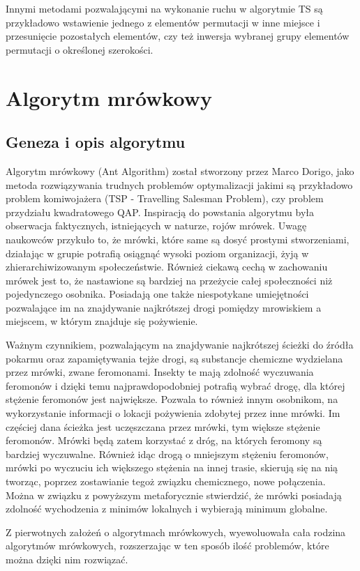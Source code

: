 Innymi metodami pozwalającymi na wykonanie ruchu w algorytmie TS są przykładowo wstawienie jednego z elementów permutacji w inne miejsce i przesunięcie pozostałych elementów, czy też inwersja wybranej grupy elementów permutacji o określonej szerokości.

\section{Algorytm mrówkowy}
\label{sec:mrowka}
\subsection{Geneza i opis algorytmu}
Algorytm mrówkowy (Ant Algorithm) został stworzony przez Marco Dorigo, jako metoda rozwiązywania trudnych problemów optymalizacji jakimi są przykładowo problem komiwojażera (TSP - Travelling Salesman Problem), czy problem przydziału kwadratowego QAP. Inspiracją do powstania algorytmu była obserwacja faktycznych, istniejących w naturze, rojów mrówek. Uwagę naukowców przykuło to, że mrówki, które same są dosyć prostymi stworzeniami, działając w grupie potrafią osiągnąć wysoki poziom organizacji, żyją w zhierarchiwizowanym społeczeństwie. Również ciekawą cechą w zachowaniu mrówek jest to, że nastawione są bardziej na przeżycie całej społeczności niż pojedynczego osobnika. Posiadają one także niespotykane umiejętności pozwalające im na znajdywanie najkrótszej drogi pomiędzy mrowiskiem a miejscem, w którym znajduje się pożywienie.

Ważnym czynnikiem, pozwalającym na znajdywanie najkrótszej ścieżki do źródła pokarmu oraz zapamiętywania tejże drogi, są substancje chemiczne wydzielana przez mrówki, zwane feromonami. Insekty te mają zdolność wyczuwania feromonów i dzięki temu najprawdopodobniej potrafią wybrać drogę, dla której stężenie feromonów jest największe. Pozwala to również innym osobnikom, na wykorzystanie informacji o lokacji pożywienia zdobytej przez inne mrówki. Im częściej dana ścieżka jest uczęszczana przez mrówki, tym większe stężenie feromonów. Mrówki będą zatem korzystać z dróg, na których feromony są bardziej wyczuwalne. Również idąc drogą o mniejszym stężeniu feromonów, mrówki po wyczuciu ich większego stężenia na innej trasie, skierują się na nią tworząc, poprzez zostawianie tegoż związku chemicznego, nowe połączenia. Można w związku z powyższym metaforycznie stwierdzić, że mrówki posiadają zdolność wychodzenia z minimów lokalnych i wybierają minimum globalne.

Z pierwotnych założeń o algorytmach mrówkowych, wyewoluowała cała rodzina algorytmów mrówkowych, rozszerzając w ten sposób ilość problemów, które można dzięki nim rozwiązać. 

